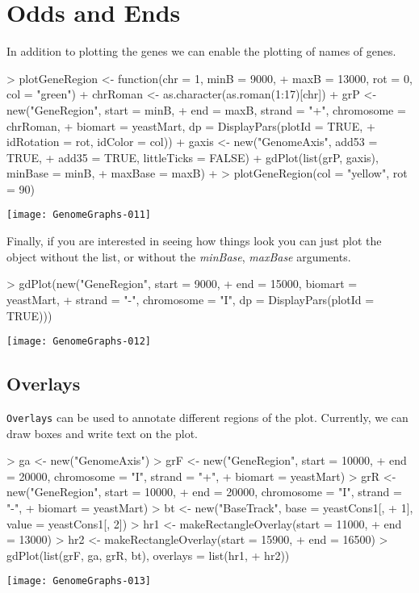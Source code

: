\documentclass[11pt]{article}
\begin{document}
\section{Odds and Ends}
In addition to plotting the genes we can enable the plotting of names of genes. 

\begin{Schunk}
\begin{Sinput}
> plotGeneRegion <- function(chr = 1, minB = 9000, 
+     maxB = 13000, rot = 0, col = "green") {
+     chrRoman <- as.character(as.roman(1:17)[chr])
+     grP <- new("GeneRegion", start = minB, 
+         end = maxB, strand = "+", chromosome = chrRoman, 
+         biomart = yeastMart, dp = DisplayPars(plotId = TRUE, 
+             idRotation = rot, idColor = col))
+     gaxis <- new("GenomeAxis", add53 = TRUE, 
+         add35 = TRUE, littleTicks = FALSE)
+     gdPlot(list(grP, gaxis), minBase = minB, 
+         maxBase = maxB)
+ }
> plotGeneRegion(col = "yellow", rot = 90)
\end{Sinput}
\end{Schunk}
\texttt{[image: GenomeGraphs-011]}

Finally, if you are interested in seeing how things look you can just
plot the object without the list, or without the \emph{minBase}, \emph{maxBase}
arguments. 
\begin{Schunk}
\begin{Sinput}
> gdPlot(new("GeneRegion", start = 9000, 
+     end = 15000, biomart = yeastMart, 
+     strand = "-", chromosome = "I", dp = DisplayPars(plotId = TRUE)))
\end{Sinput}
\end{Schunk}
\texttt{[image: GenomeGraphs-012]}

\subsection{Overlays} 
\texttt{Overlays} can be used to annotate different regions of the
plot. Currently, we can draw boxes and write text on the plot.

\begin{Schunk}
\begin{Sinput}
> ga <- new("GenomeAxis")
> grF <- new("GeneRegion", start = 10000, 
+     end = 20000, chromosome = "I", strand = "+", 
+     biomart = yeastMart)
> grR <- new("GeneRegion", start = 10000, 
+     end = 20000, chromosome = "I", strand = "-", 
+     biomart = yeastMart)
> bt <- new("BaseTrack", base = yeastCons1[, 
+     1], value = yeastCons1[, 2])
> hr1 <- makeRectangleOverlay(start = 11000, 
+     end = 13000)
> hr2 <- makeRectangleOverlay(start = 15900, 
+     end = 16500)
> gdPlot(list(grF, ga, grR, bt), overlays = list(hr1, 
+     hr2))
\end{Sinput}
\end{Schunk}
\texttt{[image: GenomeGraphs-013]}
\end{document}
